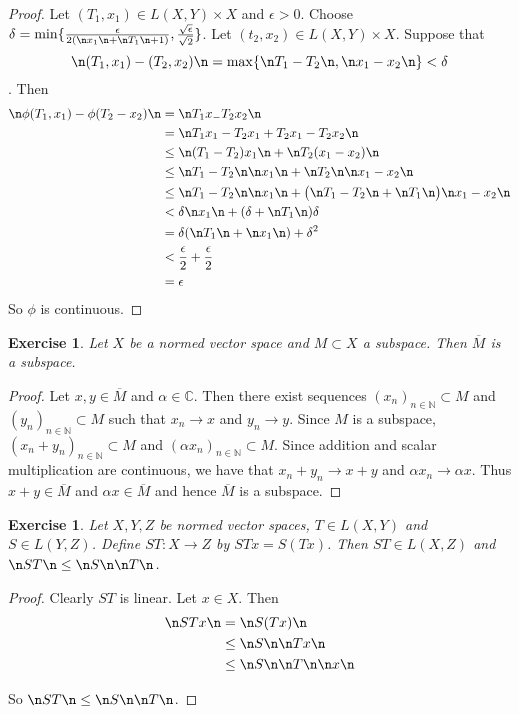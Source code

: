 \documentclass[12pt]{amsart}
\newtheorem{ex}[thm]{Exercise}
\newcommand{\al}{\alpha}
\newcommand{\del}{\delta}
\newcommand{\ep}{\epsilon}
\newcommand{\C}{\mathbb{C}}
\newcommand{\N}{\mathbb{N}}
\newcommand{\conv}[1]{\xrightarrow{#1}}
\begin{document}
\begin{proof}
	Let $(T_1, x_1) \in L(X,Y) \times X$ and $\ep > 0$. Choose $\del = \min \{\frac{\ep}{2(\n x_1 \n + \n T_1 \n +1)}, \frac{\sqrt{\ep}}{\sqrt{2}} \}$. Let $(t_2, x_2) \in L(X,Y) \times X$. Suppose that $$\n (T_1, x_1) - (T_2, x_2) \n = \max \{\n T_1 - T_2\n, \n x_1 -x_2 \n \} < \del$$. Then 
	\begin{align*}
		\n \phi(T_1, x_1) - \phi(T_2-x_2) \n
		&= \n T_1 x_ - T_2 x_2 \n\\
		&= \n T_1 x_1 - T_2 x_1 + T_2 x_1 - T_2 x_2 \n \\
		& \leq \n (T_1 - T_2) x_1 \n + \n T_2(x_1 -x_2) \n \\
		& \leq \n T_1 -T_2 \n \n x_1 \n + \n T_2 \n \n x_1 -x_2 \n \\
		& \leq \n T_1 -T_2 \n \n x_1 \n + \big(\n T_1 - T_2 \n + \n T_1 \n \big)\n x_1 -x_2 \n\\
		& < \del \n x_1 \n + (\del + \n T_1 \n ) \del \\
		&= \del (\n T_1 \n + \n x_1 \n) + \del^2\\
		& < \frac{\ep}{2} + \frac{\ep}{2}\\
		&= \ep
	\end{align*}
	So $\phi$ is continuous.
\end{proof}

\begin{ex}
	Let $X$ be a normed vector space and $M \subset X$ a subspace. Then $\overline{M}$ is a subspace.
\end{ex}

\begin{proof}
	Let $x,y \in \overline{M}$ and $\al \in \C$. Then there exist sequences $(x_n)_{n \in \N} \subset M$ and $(y_n)_{n \in \N} \subset M$ such that $x_n \conv{} x$ and $y_n \conv{} y$. Since $M$ is a subspace, $(x_n +y_n)_{n \in \N} \subset M$ and $(\al x_n)_{n \in \N} \subset M$. Since addition and scalar multiplication are continuous, we have that $x_n + y_n \conv{} x+y$ and $\al x_n \conv{} \al x$. Thus $x+y \in \overline{M}$ and $\al x \in \overline{M}$ and hence $\overline{M}$ is a subspace.
\end{proof}

\begin{ex}
	Let $X,Y,Z$ be normed vector spaces, $T \in L(X,Y)$ and $S \in L(Y,Z)$. Define $ST:X \rightarrow Z$ by $STx = S(Tx)$. Then $ST \in L(X,Z)$ and $\n ST \n \leq \n S \n \n T \n$. 
\end{ex}

\begin{proof}
	Clearly $ST$ is linear. Let $x \in X$. Then 
	\begin{align*}
		\n ST x \n
		& = \n S(Tx) \n\\
		& \leq \n S \n \n Tx \n \\
		& \leq \n S \n \n T \n \n x \n
	\end{align*}
	
	So $\n ST \n \leq \n S \n \n T \n$.
\end{proof}
\end{document}
